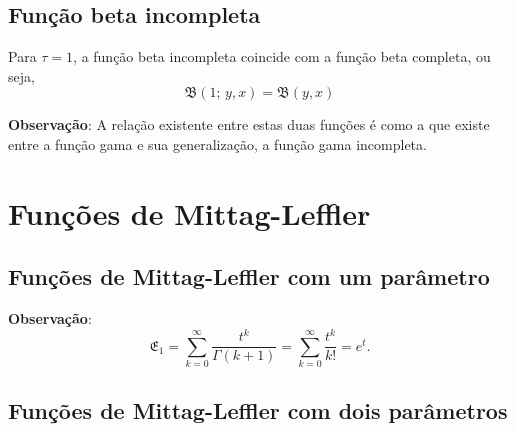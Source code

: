 \subsection{Função beta incompleta}


Para \(\tau = 1\), a função beta incompleta coincide com a função beta completa, ou seja,
\[\mathfrak{B}(1;\, y,x) = \mathfrak{B}(y,x)\]

\textbf{Observação}: A relação existente entre estas duas funções é como a que existe entre a função gama e sua generalização, a função gama incompleta.





\section{Funções de Mittag-Leffler}

\subsection{Funções de Mittag-Leffler com um parâmetro}


\textbf{Observação}:
\begin{equation}
\mathfrak{E}_1 = \displaystyle\sum_{k=0}^{\infty} \dfrac{t^k}{\Gamma(k + 1)} = \displaystyle\sum_{k=0}^{\infty} \dfrac{t^k}{k!} = e^t.
\end{equation}

\subsection{Funções de Mittag-Leffler com dois parâmetros}

